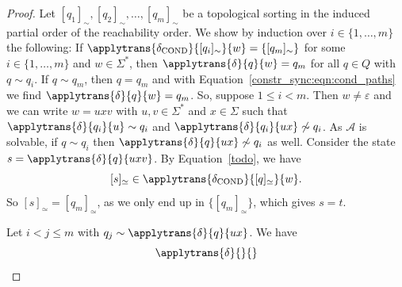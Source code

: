 \begin{proof}
 Let $[q_1]_{\sim}, [q_2]_{\sim}, \ldots, [q_m]_{\sim}$
 be a topological sorting in the induced partial order of the reachability order. 
 We show by induction over $i \in \{1,\ldots,m\}$ the following:
 If $\applytrans{\delta_{\text{COND}}}{[q_i]_{\sim}}{w} = \{ [q_m]_{\sim} \}$ 
 for some $i \in \{1,\ldots,m\}$ and $w \in \Sigma^*$,
 then $\applytrans{\delta}{q}{w} = q_m$
 for all $q \in Q$ with $q \sim q_i$.
 If $q \sim q_m$, then $q = q_m$
 and with Equation~\eqref{constr_sync:eqn:cond_paths} 
 we find $\applytrans{\delta}{q}{w} = q_m$.
 So, suppose $1 \le i < m$.
 Then $w \ne \varepsilon$ and 
 we can write $w = uxv$ with $u,v \in \Sigma^*$ and $x \in \Sigma$
 such that $\applytrans{\delta}{q_i}{u} \sim q_i$
 and $\applytrans{\delta}{q_i}{ux} \not\sim q_i$.
 As $\mathcal A$ is solvable, if $q \sim q_i$ 
 then $\applytrans{\delta}{q}{ux} \not\sim q_i$ as well.
 Consider the state $s = \applytrans{\delta}{q}{uxv}$.
 By Equation~\eqref{todo}, we have
 \[
  [s]_{\simeq} \in \applytrans{\delta_{\text{COND}}}{[q]_{\simeq}}{w}. %
 \]
 So $[s]_{\simeq} = [q_m]_{\simeq}$, as we only end up in $\{ [q_m]_{\simeq}\}$,
 which gives $s = t$. %
 
 
 
 
 
 
 
 Let $i < j \le m$ with $q_j \sim \applytrans{\delta}{q}{ux}$.
 We have
 \[ 
  \applytrans{\delta}{}{}
 \] 
 
 
 
 
 
 
 
 
 
 
 
 
 

\end{proof}
